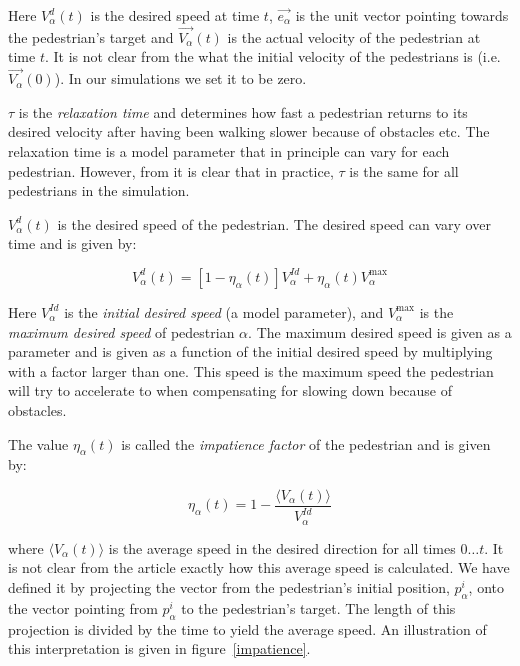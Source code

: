Here $V_{\alpha}^{d}(t)$ is the desired speed at time $t$, 
$\overrightarrow{e_{\alpha}}$ is the unit vector pointing towards the 
pedestrian's target and  $\overrightarrow{V_{\alpha}}(t)$ is the actual 
velocity of the pedestrian at time $t$. It is not clear from the what the 
initial velocity of the pedestrians is (i.e. $\overrightarrow{V_\alpha}(0)$). 
In our simulations we set it to be zero.

$\tau$ is the \emph{relaxation time} and determines how fast a pedestrian 
returns to its desired velocity after having been walking slower because of 
obstacles etc. The relaxation time is a model parameter that in principle can vary 
for each pedestrian. However, from \cite{self-org} it is clear that in 
practice, $\tau$ is the same for all pedestrians in the simulation.

$V_{\alpha}^{d}(t)$ is the desired speed of the pedestrian. The desired speed 
can vary over time and is given by:

\begin{equation}\label{eqn:desired-speed}
    V_{\alpha}^{d}(t) = \left[ 1 - \eta_{\alpha}(t) \right] 
    V_{\alpha}^{Id} +
    \eta_{\alpha}(t) V_{\alpha}^{\text{max}}
\end{equation}

Here $V_{\alpha}^{Id}$ is the \emph{initial desired speed} (a model 
parameter), and $V_{\alpha}^{\text{max}}$ is the \emph{maximum desired speed} 
of pedestrian $\alpha$. The maximum desired speed is given as a parameter and 
is given as a function of the initial desired speed by multiplying with a 
factor larger than one. This speed is the maximum speed the pedestrian will 
try to accelerate to when compensating for slowing down because of obstacles.

The value $\eta_{\alpha}(t)$ is called the \emph{impatience factor} of the 
pedestrian and is given by:

\begin{equation}\label{eqn:impatience}
	\eta_{\alpha}(t) =
    1 - \frac{\langle V_{\alpha}(t)\rangle}{V^{Id}_{\alpha}}
\end{equation}

where $\langle V_{\alpha}(t) \rangle$ is the average speed in the desired 
direction for all times $0\dots t$. It is not clear from the article exactly 
how this average speed is calculated. We have defined it by projecting the 
vector from the pedestrian's initial position, $p^i_\alpha$, onto the vector 
pointing from $p^i_\alpha$ to the pedestrian's target. The length of this 
projection is divided by the time to yield the average speed. An 
illustration of this interpretation is given in figure~\ref{impatience}.

